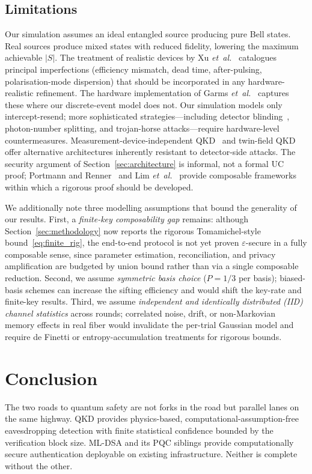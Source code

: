 \documentclass[conference]{IEEEtran}
\begin{document}
\subsection{Limitations}
\label{sec:limitations}
Our simulation assumes an ideal entangled source producing pure Bell states. Real sources produce mixed states with reduced fidelity, lowering the maximum achievable $|S|$. The treatment of realistic devices by Xu \emph{et~al.}~\cite{xu2020} catalogues principal imperfections (efficiency mismatch, dead time, after-pulsing, polarisation-mode dispersion) that should be incorporated in any hardware-realistic refinement. The hardware implementation of Garms \emph{et~al.}~\cite{garms2024} captures these where our discrete-event model does not. Our simulation models only intercept-resend; more sophisticated strategies---including detector blinding~\cite{lydersen2010}, photon-number splitting, and trojan-horse attacks---require hardware-level countermeasures. Measurement-device-independent QKD~\cite{lo2012} and twin-field QKD~\cite{lucamarini2018} offer alternative architectures inherently resistant to detector-side attacks. The security argument of Section~\ref{sec:architecture} is informal, not a formal UC proof; Portmann and Renner~\cite{portmann2022} and Lim \emph{et~al.}~\cite{lim2014} provide composable frameworks within which a rigorous proof should be developed.

We additionally note three modelling assumptions that bound the generality of our results. First, a \emph{finite-key composability gap} remains: although Section~\ref{sec:methodology} now reports the rigorous Tomamichel-style bound~\eqref{eq:finite_rig}, the end-to-end protocol is not yet proven $\varepsilon$-secure in a fully composable sense, since parameter estimation, reconciliation, and privacy amplification are budgeted by union bound rather than via a single composable reduction. Second, we assume \emph{symmetric basis choice} ($P = 1/3$ per basis); biased-basis schemes can increase the sifting efficiency and would shift the key-rate and finite-key results. Third, we assume \emph{independent and identically distributed (IID) channel statistics} across rounds; correlated noise, drift, or non-Markovian memory effects in real fiber would invalidate the per-trial Gaussian model and require de Finetti or entropy-accumulation treatments for rigorous bounds.

\section{Conclusion}
\label{sec:conclusion}
The two roads to quantum safety are not forks in the road but parallel lanes on the same highway. QKD provides physics-based, computational-assumption-free eavesdropping detection with finite statistical confidence bounded by the verification block size. ML-DSA and its PQC siblings provide computationally secure authentication deployable on existing infrastructure. Neither is complete without the other.
\end{document}
